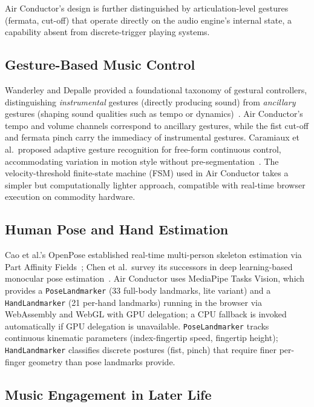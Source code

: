 \documentclass[conference]{IEEEtran}
\begin{document}
Air Conductor's design is further distinguished by articulation-level
gestures (fermata, cut-off) that operate directly on the audio engine's
internal state, a capability absent from discrete-trigger playing
systems.

\subsection{Gesture-Based Music Control}

Wanderley and Depalle provided a foundational taxonomy of gestural
controllers, distinguishing \emph{instrumental} gestures (directly
producing sound) from \emph{ancillary} gestures (shaping sound
qualities such as tempo or dynamics)~\cite{rw1}. Air Conductor's tempo
and volume channels correspond to ancillary gestures, while the fist
cut-off and fermata pinch carry the immediacy of instrumental gestures.
Caramiaux et al.\ proposed adaptive gesture recognition for free-form
continuous control, accommodating variation in motion style without
pre-segmentation~\cite{rw4}. The velocity-threshold finite-state
machine (FSM) used in Air Conductor takes a simpler but computationally
lighter approach, compatible with real-time browser execution on
commodity hardware.

\subsection{Human Pose and Hand Estimation}

Cao et al.'s OpenPose established real-time multi-person skeleton
estimation via Part Affinity Fields~\cite{rw5}; Chen et al.\ survey its
successors in deep learning-based monocular pose estimation~\cite{rw6}.
Air Conductor uses MediaPipe Tasks Vision, which provides a
\texttt{PoseLandmarker} (33 full-body landmarks, lite variant) and a
\texttt{HandLandmarker} (21 per-hand landmarks) running in the browser
via WebAssembly and WebGL with GPU delegation; a CPU fallback is
invoked automatically if GPU delegation is unavailable.
\texttt{PoseLandmarker} tracks continuous kinematic parameters
(index-fingertip speed, fingertip height); \texttt{HandLandmarker}
classifies discrete postures (fist, pinch) that require finer
per-finger geometry than pose landmarks provide.

\subsection{Music Engagement in Later Life}
\end{document}
